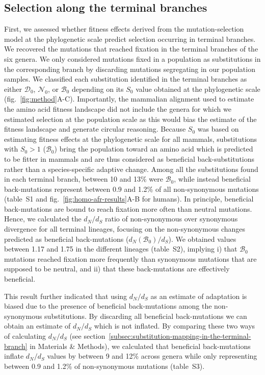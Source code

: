 \documentclass{article}
\newcommand{\dn}{d_N}
\newcommand{\ds}{d_S}
\newcommand{\dnds}{\dn / \ds}
\newcommand{\Sphy}{S_{0}}
\newcommand{\SphyDel}{\mathcal{D}_0}
\newcommand{\SphyNeu}{\mathcal{N}_0}
\newcommand{\SphyBen}{\mathcal{B}_0}
\begin{document}
    \subsection*{Selection along the terminal branches}
    First, we assessed whether fitness effects derived from the mutation-selection model at the phylogenetic scale predict selection occurring in terminal branches.
    We recovered the mutations that reached fixation in the terminal branches of the six genera.
    We only considered mutations fixed in a population as substitutions in the corresponding branch by discarding mutations segregating in our population samples.
    We classified each substitution identified in the terminal branches as either $\SphyDel$, $\SphyNeu$, or $\SphyBen$ depending on its $\Sphy$ value obtained at the phylogenetic scale (fig.~\ref{fig:method}A-C).
    Importantly, the mammalian alignment used to estimate the amino acid fitness landscape did not include the genera for which we estimated selection at the population scale as this would bias the estimate of the fitness landscape and generate circular reasoning.
    Because $\Sphy$ was based on estimating fitness effects at the phylogenetic scale for all mammals, substitutions with $\Sphy>1$ ($\SphyBen$) bring the population toward an amino acid which is predicted to be fitter in mammals and are thus considered as beneficial back-substitutions rather than a species-specific adaptive change.
    Among all the substitutions found in each terminal branch, between 10 and 13\% were $\SphyBen$, while instead beneficial back-mutations represent between 0.9 and 1.2\% of all non-synonymous mutations (table~S1 and fig.~\ref{fig:homo-afr-results}A-B for humans).
    In principle, beneficial back-mutations are bound to reach fixation more often than neutral mutations.
    Hence, we calculated the $\dnds$ ratio of non-synonymous over synonymous divergence for all terminal lineages, focusing on the non-synonymous changes predicted as beneficial back-mutations ($\dn(\SphyBen) / \ds$).
    We obtained values between 1.17 and 1.75 in the different lineages (table~S2), implying i) that $\SphyBen$ mutations reached fixation more frequently than synonymous mutations that are supposed to be neutral, and ii) that these back-mutations are effectively beneficial.

    This result further indicated that using $\dnds$ as an estimate of adaptation is biased due to the presence of beneficial back-mutations among the non-synonymous substitutions.
    By discarding all beneficial back-mutations we can obtain an estimate of $\dnds$ which is not inflated.
    By comparing these two ways of calculating $\dnds$ (see section~\ref{subsec:substitution-mapping-in-the-terminal-branch} in Materials \& Methods), we calculated that beneficial back-mutations inflate $\dnds$ values by between 9 and 12\% across genera while only representing between 0.9 and 1.2\% of non-synonymous mutations (table~S3).
\end{document}
